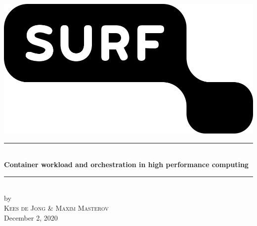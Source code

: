 \documentclass[12pt]{article}
\begin{document}
\begin{titlepage}

\newcommand{\HRule}{\rule{\linewidth}{0.5mm}}

\begin{center}
\includegraphics[width=\linewidth/3]{images/surf.png}

\HRule \\[0.4cm]
{\huge \bfseries Container workload and orchestration in high performance computing}\\[0.4cm]
\HRule \\[0.5cm]
 
by\\[0.2cm]
\textsc{\Large Kees de Jong \& Maxim Masterov}\\[0.2cm]

{\Large December 2, 2020}\\[1cm]

\vfill

\end{center}
\end{titlepage}



\end{document}
